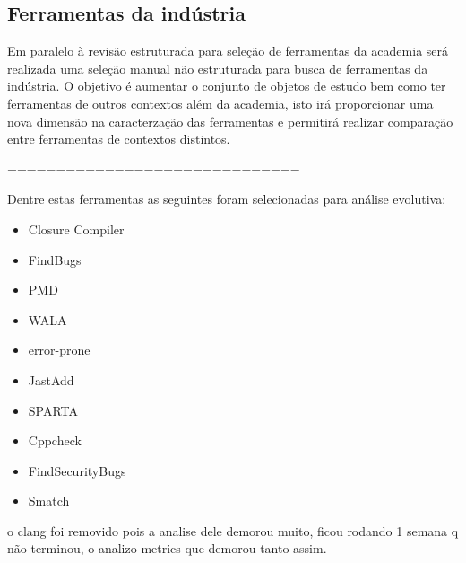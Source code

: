 \subsection{Ferramentas da indústria}

Em paralelo à revisão estruturada para seleção de ferramentas da academia será
realizada uma seleção manual não estruturada para busca de ferramentas da
indústria. O objetivo é aumentar o conjunto de objetos de estudo bem como ter
ferramentas de outros contextos além da academia, isto irá proporcionar uma
nova dimensão na caracterzação das ferramentas e permitirá realizar comparação
entre ferramentas de contextos distintos.


==============================

Dentre estas ferramentas as seguintes foram selecionadas para análise evolutiva:

\begin{itemize}
  \item Closure Compiler         
  \item FindBugs                 
  \item PMD                      
  \item WALA                    
  \item error-prone
  \item JastAdd
  \item SPARTA
  \item Cppcheck
  \item FindSecurityBugs
  \item Smatch
\end{itemize}

o clang foi removido pois a analise dele demorou muito, ficou rodando 1 semana q não
terminou, o analizo metrics que demorou tanto assim.

